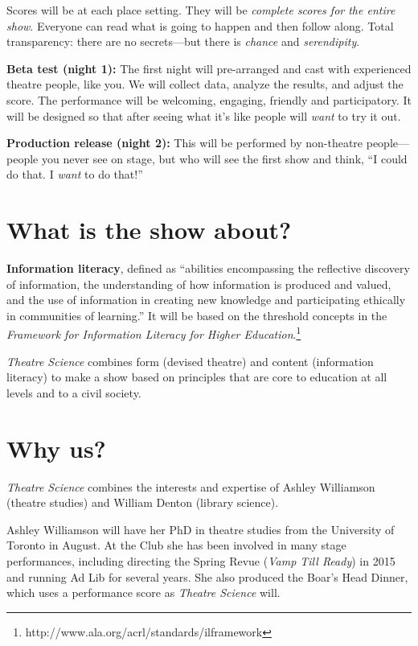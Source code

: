 \documentclass[11pt]{article}
\begin{document}
Scores will be at each place setting.   They will be \textit{complete scores for the entire show}.  Everyone can read what is going to happen and then follow along.  Total transparency: there are no secrets---but there is \textit{chance} and \textit{serendipity}.

\textbf{Beta test (night 1):}  The first night will pre-arranged and cast with experienced theatre people, like you.  We will collect data, analyze the results, and adjust the score.  The performance will be welcoming, engaging, friendly and participatory.  It will be designed so that after seeing what it's like people will \textit{want} to try it out.

\textbf{Production release (night 2):} This will be performed by non-theatre people---people you never see on stage, but who will see the first show and think, ``I could do that. I \textit{want} to do that!''

\section{What is the show about?}

\textbf{Information literacy}, defined as ``abilities encompassing the reflective discovery of information, the understanding of how information is produced and valued, and the use of information in creating new knowledge and participating ethically in communities of learning.''  It will be based on the threshold concepts in the \textit{Framework for Information Literacy for Higher Education}.\footnote{http://www.ala.org/acrl/standards/ilframework}

\textit{Theatre Science} combines form (devised theatre) and content (information literacy) to make a show based on principles that are core to education at all levels and to a civil society.

\section{Why us?}

\textit{Theatre Science} combines the interests and expertise of Ashley Williamson (theatre studies) and William Denton (library science).

Ashley Williamson will have her PhD in theatre studies from the University of Toronto in August.  At the Club she has been involved in many stage performances, including directing the Spring Revue (\textit{Vamp Till Ready}) in 2015 and running Ad Lib for several years.  She also produced the Boar's Head Dinner, which uses a performance score as \textit{Theatre Science} will.
\end{document}
